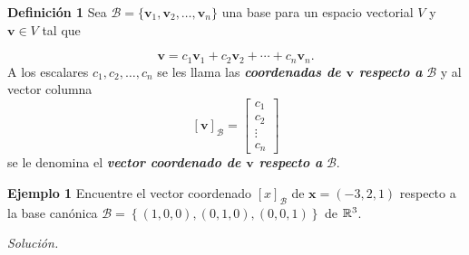 {\nologo
\begin{frame}%

\begin{defi}{\textbf{Definición 1}}
	Sea $\mathcal{B}=\{\mathbf{v}_1, \mathbf{v}_2, \hdots , \mathbf{v}_n \}$ una base para un espacio \hspace{-1mm} vectorial $V$ y 
	$\mathbf{v}\in V$ \hspace{-1mm} tal que
	
	\vspace{-5mm}
	\[
	\mathbf{v} = c_1 \mathbf{v}_1 + c_2\mathbf{v}_2 + \cdots + c_n\mathbf{v}_n.
	\]
	A los escalares $c_1, c_2,\hdots,c_n$
	se les llama las \textbf{\textit{coordenadas de $\mathbf{v}$ respecto a}} $\mathcal{B}$ y al vector columna
	\[
	\left[ \mathbf{v} \right]_{\mathcal{B}} = 
	\left[
	\begin{array}{c}
	c_1\\
	c_2\\
	\vdots\\
	c_n
	\end{array}
	\right]
	\]
	se le denomina el \textbf{\textit{vector coordenado de $\mathbf{v}$ respecto a}} $\mathcal{B}$.
\end{defi}	

\vspace{0mm}

\begin{ej}{\textbf{Ejemplo 1}}\justifying 
	Encuentre el vector coordenado $\left[ x \right]_{\mathcal{B}}$ de $\mathbf{x}=(-3,2,1)$ respecto a
	la base canónica $\mathcal{B} = \left\{ (1,0,0), (0,1,0), (0,0,1) \right\}$ de $\mathbb{R}^3$.
\end{ej}
\textit{Solución.}

\end{frame}
}


\subsection{}

